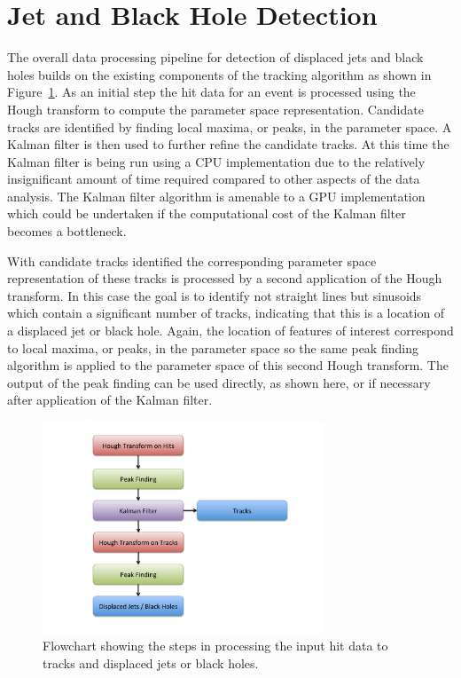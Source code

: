 \documentclass[preprint,sort&compress]{elsarticle}
\begin{document}
\section{Jet and Black Hole Detection}

The overall data processing pipeline for detection of displaced jets and black holes builds on the existing components of the tracking algorithm as shown in Figure~\ref{fig:Flowchart}.  As an initial step the hit data for an event is processed using the Hough transform to compute the parameter space representation.  Candidate tracks are identified by finding local maxima, or peaks, in the parameter space.  A Kalman filter is then used to further refine the candidate tracks.  At this time the Kalman filter is being run using a CPU implementation due to the relatively insignificant amount of time required compared to other aspects of the data analysis.  The Kalman filter algorithm is amenable to a GPU implementation which could be undertaken if the computational cost of the Kalman filter becomes a bottleneck.

With candidate tracks identified the corresponding parameter space representation of these tracks is processed by a second application of the Hough transform.  In this case the goal is to identify not straight lines but sinusoids which contain a significant number of tracks, indicating that this is a location of a displaced jet or black hole.  Again, the location of features of interest correspond to local maxima, or peaks, in the parameter space so the same peak finding algorithm is applied to the parameter space of this second Hough transform.  The output of the peak finding can be used directly, as shown here, or if necessary after application of the Kalman filter.

\begin{figure}[!Hhtb]
\begin{center}
\includegraphics[width=0.75\textwidth]{Flowchart.pdf} 
\caption{Flowchart showing the steps in processing the input hit data to tracks and displaced jets or black holes.\label{fig:Flowchart}}
\end{center}
\end{figure}
\end{document}
